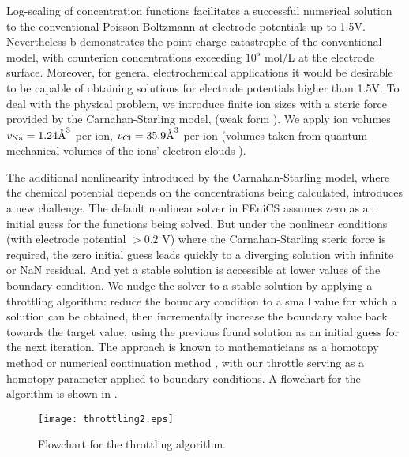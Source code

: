 Log-scaling of concentration functions facilitates a successful numerical solution to
the conventional Poisson-Boltzmann at electrode potentials
up to 1.5V. Nevertheless b demonstrates the
point charge catastrophe of the conventional model, with counterion
concentrations exceeding $10^{5}$ mol/L at the electrode
surface. Moreover, for general electrochemical applications it would
be desirable to be capable of obtaining solutions for electrode
potentials higher than 1.5V. To deal with the physical problem, we
introduce finite ion sizes with a steric force provided by the
Carnahan-Starling model,  (weak form
).  We apply ion volumes
$v_{\ce{Na}}=1.24 \textrm{\AA}^{3}$ per  ion,
$v_{\ce{Cl}}=35.9 \textrm{\AA}^{3}$ per  ion (volumes taken from
quantum mechanical volumes of the ions' electron clouds
\cite{ParsonsNinham2009}).

The additional nonlinearity introduced by the Carnahan-Starling model,
where the chemical potential depends on the concentrations being
calculated, introduces a new challenge. The default nonlinear solver
in FEniCS assumes zero as an initial guess for the functions being
solved. But under the nonlinear conditions (with electrode potential
$>0.2$ V) where the Carnahan-Starling steric force is required, the
zero initial guess leads quickly to a diverging solution with infinite
or NaN
residual. And yet a stable solution is accessible at lower values of
the boundary condition. We nudge the solver to a stable solution by
applying a throttling algorithm: reduce the boundary condition to a
small value for which a solution can be obtained, then incrementally
increase the boundary value back towards the target value, using the
previous found solution as an initial guess for the next
iteration. The approach is known to mathematicians as a homotopy
method \cite{homotopy_analysis_Liao2012}
or numerical continuation method \cite{allgower1990numerical},
with our throttle serving as a homotopy parameter applied to boundary
conditions.  A flowchart for the algorithm is shown in
.

\begin{figure}
\centering
\texttt{[image: throttling2.eps]}
\caption{Flowchart for the throttling algorithm. }
\label{fig:throttling_algorithm}
\end{figure}

